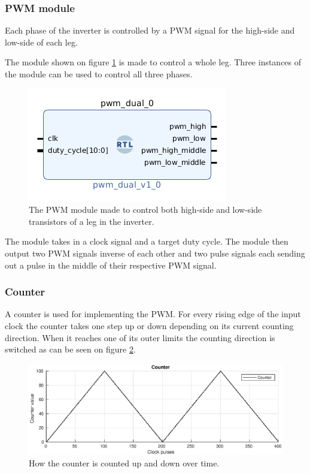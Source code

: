 \subsubsection{PWM module}
\label{sec:pwm}
Each phase of the inverter is controlled by a PWM signal for the high-side and low-side of each leg.

The module shown on figure \ref{fig:pwm_module} is made to control a whole leg. Three instances of the module can be used to control all three phases.
\begin{figure}[H]
	\centering
	\includegraphics[width=0.5 \textwidth]{pictures/software/pwm_module.png}
	\caption{The PWM module made to control both high-side and low-side transistors of a leg in the inverter.}
	\label{fig:pwm_module}
\end{figure}
The module takes in a clock signal and a target duty cycle. The module then output two PWM signals inverse of each other and two pulse signals each sending out a pulse in the middle of their respective PWM signal.


\subsubsection*{Counter}
A counter is used for implementing the PWM. For every rising edge of the input clock the counter takes one step up or down depending on its current counting direction. When it reaches one of its outer limits the counting direction is switched as can be seen on figure \ref{fig:counter}.

\begin{figure}[H]
	\centering
	\includegraphics[width=1 \textwidth]{pictures/software/counter.eps}
	\caption{How the counter is counted up and down over time.}
	\label{fig:counter}
\end{figure}

